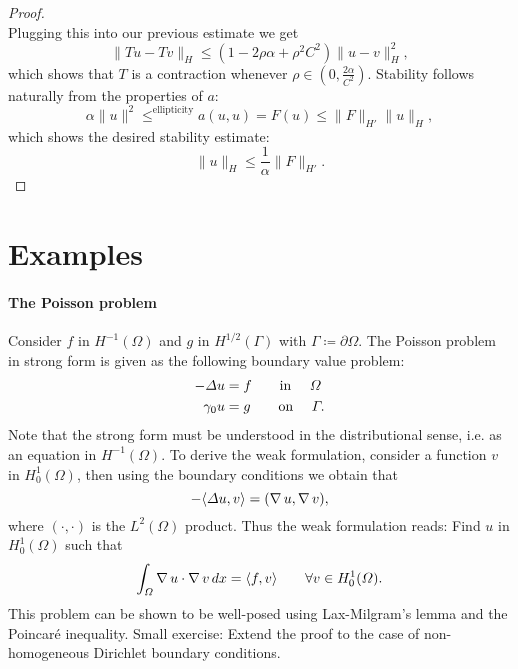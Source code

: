 \begin{proof}
\begin{equation*}
\end{equation*}
    Plugging this into our previous estimate we get
    \begin{equation*}
\| Tu - Tv \|_H \leq (1 - 2\rho \alpha + \rho^2 C^2)\| u-v \|_H^2 ,
\end{equation*}
    which shows that $T$ is a contraction whenever $\rho\in (0,\frac{2\alpha}{C^2})$. Stability follows naturally from the properties of $a$:
    \begin{equation*}
\alpha \| u \|^2 \leq^\text{ellipticity} a(u,u) = F(u) \leq \| F \|_{H'} \|u \|_H,
\end{equation*}
    which shows the desired stability estimate: 
        \begin{equation*}
\| u \|_H \leq \frac{1}{\alpha} \| F \|_{H'}.
\end{equation*}
\end{proof}

\section{Examples}
\paragraph{The Poisson problem} Consider $f$ in $H^{-1}(\Omega)$ and $g$ in $H^{1/2}(\Gamma)$ with $\Gamma\coloneqq \partial\Omega$. The Poisson problem in strong form is given as the following boundary value problem: 
    \begin{align*}
        -\Delta u  &= f \qquad \text{in }\quad\Omega\\
        \gamma_0 u &= g \qquad \text{on }\quad \Gamma.
    \end{align*}
Note that the strong form must be understood in the distributional sense, i.e. as an equation in $H^{-1}(\Omega)$. To derive the weak formulation, consider a function $v$ in $H_0^1(\Omega)$, then using the boundary conditions we obtain that 
    \begin{equation*}
-\langle \Delta u,v\rangle = (\operatorname{\nabla} u, \operatorname{\nabla} v),
\end{equation*}
where $(\cdot, \cdot)$ is the $L^2(\Omega)$ product. Thus the weak formulation reads: Find $u$ in $H_0^1(\Omega)$ such that 
    \begin{equation*}
\int_\Omega \operatorname{\nabla} u\cdot \operatorname{\nabla} v\,dx = \langle f, v\rangle \qquad \forall v\in H_0^1(\Omega).
\end{equation*}
This problem can be shown to be well-posed using Lax-Milgram's lemma and the Poincaré inequality. Small exercise: Extend the proof to the case of non-homogeneous Dirichlet boundary conditions.

